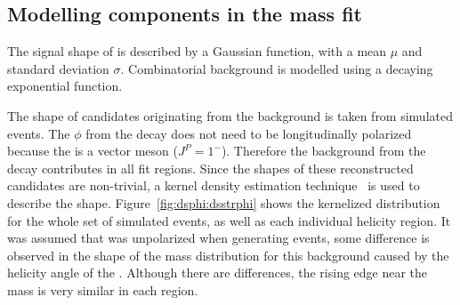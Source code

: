 
\subsection{Modelling components in the mass fit}
The signal shape of \btodsphi is described by a Gaussian function, with a mean $\mu$ and standard
deviation $\sigma$.
Combinatorial background is modelled using a decaying exponential function.

The shape of \Bp candidates originating from the \btodsstrphi background is taken from simulated
events.
The $\phi$ from the decay \btodsstrphi does not need to be longitudinally polarized because the
\Dssp is a vector meson ($J^P=1^-$).
Therefore the background from the decay \btodsstrphi contributes in all fit regions.
Since the shapes of these reconstructed candidates are non-trivial, a kernel density estimation
technique~\cite{Cranmer:2000du} is used to describe the shape.
Figure~\ref{fig:dsphi:dsstrphi} shows the kernelized distribution for the whole set of simulated
events, as well as each individual helicity region.
It was assumed that \Dssp was unpolarized when generating events, some difference is observed in
the shape of the mass distribution for this background caused by the helicity angle of the \phii.
Although there are differences, the rising edge
near the \Bp mass is very similar in each region.

